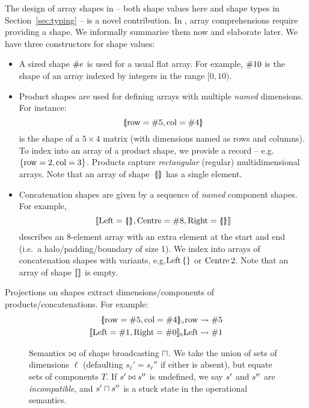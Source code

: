 The design of array shapes in \starr{} -- both shape values here and shape types in Section~\ref{sec:typing} -- is a novel contribution.
In \starr{}, array comprehensions require providing a shape.
We informally summarise them now and elaborate later. 
We have three constructors for shape values:
\begin{itemize}
    \item A sized shape $\#{e}$ is used for a usual flat array. For example, $\#{10}$ is the shape of an array indexed by integers in the range $[ 0, 10)$.
    \item Product shapes are used for defining arrays with multiple \textit{named} dimensions. For instance: 
    $$\sproductval{\mathrm{row} = \ssize{5}, \mathrm{col} = \ssize{4}}$$ 
    is the shape of a $5 \times 4$ matrix (with dimensions named as rows and columns). To index into an array of a product shape, we provide a record -- e.g.\@ $\srecordval{\mathrm{row} = 2, \mathrm{col} = 3}$.
    Products capture \textit{rectangular} (regular) multidimensional arrays.
    Note that an array of shape~$\sproductval{}$ has a single element.
    \item Concatenation shapes are given by a sequence of \textit{named} component shapes. For example,
    $$\sconcatval{ \mathrm{Left}= \sproductval{}, \mathrm{Centre}= \ssize{8}, \mathrm{Right}= \sproductval{} }$$
    describes an 8-element array with an extra element at the start and end (i.e.\ a halo/padding/boundary of size 1). We index into arrays of concatenation shapes with variants, e.g.\@ $\stag{\mathrm{Left}}{\srecordval{}}$ or ${\mathrm{Centre}}\,{2}$.
    Note that an array of shape $\sconcatval{}$ is empty.
\end{itemize}
Projections on shapes extract dimensions/components of products/concatenations. For example: 
\begin{align*}
\sproductproj{ \sproductval{\mathrm{row} = \ssize{5}, \mathrm{col} = \ssize{4}}}{\mathrm{row}} &\step \ssize 5 \\
\sconcatproj{\sconcatval{ \mathrm{Left}= \ssize{1}, \mathrm{Right}= \ssize{0}}}{\mathrm{Left}} &\step \ssize 1
\end{align*}

\begin{figure}
    \centering
    
    \caption{
        Semantics $\bowtie$ of shape broadcasting $\sqcap$. 
        We take the union of sets of dimensions $\ell$ (defaulting $s_\ell' = s_\ell''$ if either is absent), but equate sets of components $T$. 
        If $s' \bowtie s''$ is undefined, we say $s'$ and $s''$ are \emph{incompatible}, and ${s'} \sqcap {s''}$ is a stuck state in the operational semantics.
    }
    \label{fig:broadcasting}
\end{figure}

